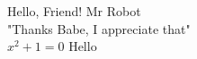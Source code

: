 \documentclass{article}
\begin{document}
Hello, Friend! Mr Robot \\
"Thanks Babe, I appreciate that"\\
$x^2+1=0$
Hello 
\end{document}
